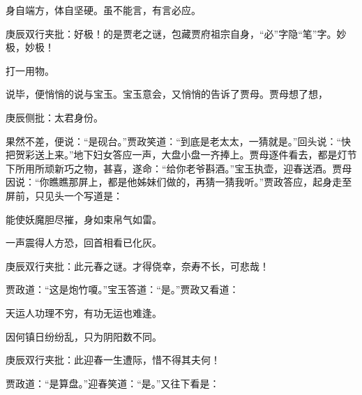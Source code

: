 \begin{parag}
    身自端方，体自坚硬。虽不能言，有言必应。\begin{note}庚辰双行夹批：好极！的是贾老之谜，包藏贾府祖宗自身，“必”字隐“笔”字。妙极，妙极！\end{note}打一用物。
\end{parag}


\begin{parag}
    说毕，便悄悄的说与宝玉。宝玉意会，又悄悄的告诉了贾母。贾母想了想，\begin{note}庚辰侧批：太君身份。\end{note}果然不差，便说：“是砚台。”贾政笑道：“到底是老太太，一猜就是。”回头说：“快把贺彩送上来。”地下妇女答应一声，大盘小盘一齐捧上。贾母逐件看去，都是灯节下所用所顽新巧之物，甚喜，遂命：“给你老爷斟酒。”宝玉执壶，迎春送酒。贾母因说：“你瞧瞧那屏上，都是他姊妹们做的，再猜一猜我听。”贾政答应，起身走至屏前，只见头一个写道是：
\end{parag}


\begin{poem}
    \begin{pl}能使妖魔胆尽摧，身如束帛气如雷。\end{pl}

    \begin{pl}一声震得人方恐，回首相看已化灰。\end{pl}
    \begin{note}庚辰双行夹批：此元春之谜。才得侥幸，奈寿不长，可悲哉！\end{note}
\end{poem}


\begin{parag}
    贾政道：“这是炮竹嗄。”宝玉答道：“是。”贾政又看道：
\end{parag}


\begin{poem}
    \begin{pl}天运人功理不穷，有功无运也难逢。\end{pl}

    \begin{pl}因何镇日纷纷乱，只为阴阳数不同。\end{pl}
    \begin{note}庚辰双行夹批：此迎春一生遭际，惜不得其夫何！\end{note}
\end{poem}


\begin{parag}
    贾政道：“是算盘。”迎春笑道：“是。”又往下看是：
\end{parag}


